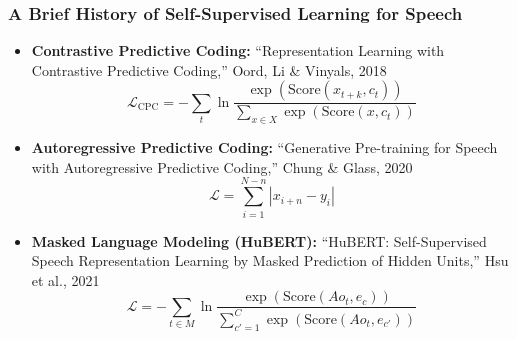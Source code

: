 \documentclass{beamer}
\begin{document}
\begin{frame}
  \frametitle{A Brief History of Self-Supervised Learning for Speech}

  \begin{itemize}
  \item {\bf Contrastive Predictive Coding:} ``Representation Learning with
    Contrastive Predictive Coding,'' Oord, Li \& Vinyals, 2018
    \begin{displaymath}
      {\mathcal L}_{\text{CPC}} = -\sum_t \ln\frac{\exp\left(\text{Score}(x_{t+k},c_t)\right)}{\sum_{x\in X}\exp\left(\text{Score}(x,c_t)\right)}
    \end{displaymath}
  \item {\bf Autoregressive Predictive Coding:} ``Generative
    Pre-training for Speech with Autoregressive Predictive Coding,''
    Chung \& Glass, 2020
    \begin{displaymath}
      {\mathcal L} = \sum_{i=1}^{N-n}\left|x_{i+n}-y_i\right|
    \end{displaymath}
  \item {\bf Masked Language Modeling (HuBERT):} ``HuBERT:
    Self-Supervised Speech Representation Learning by Masked
    Prediction of Hidden Units,'' Hsu et al., 2021
    \begin{displaymath}
      {\mathcal L} = -\sum_{t\in M} \ln\frac{\exp\left(\text{Score}(Ao_t,e_c)\right)}{\sum_{c'=1}^C\exp\left(\text{Score}(Ao_t,e_{c'})\right)}
    \end{displaymath}
  \end{itemize}
\end{frame}
\end{document}
